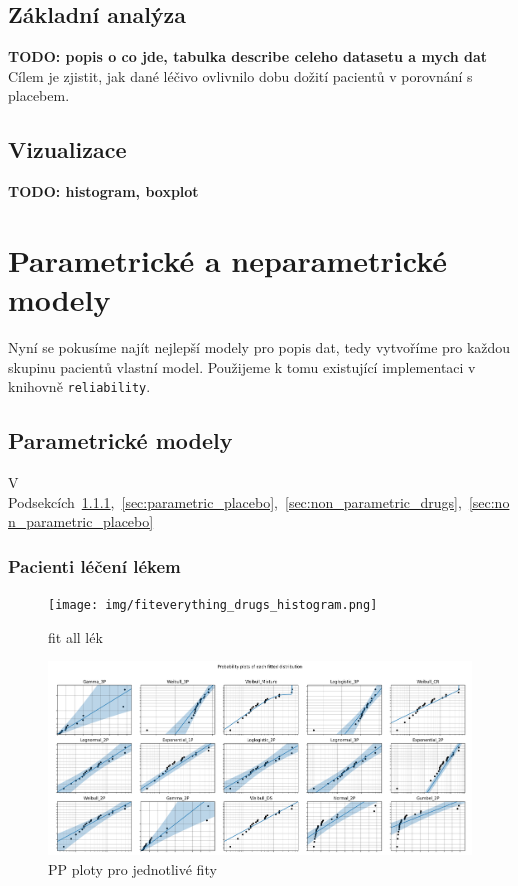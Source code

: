 \documentclass[a4, 11pt]{article}
\newcommand{\commm}[1]{{\textcolor[cmyk]{0,1,0,0}{\textbf{\textsf{#1}}}}}      %
\theoremstyle{definition}
\theoremstyle{remark}
\begin{document}
	\subsection{Základní analýza}
	\commm{TODO: popis o co jde, tabulka describe celeho datasetu a mych dat} 
	Cílem je zjistit, jak dané léčivo ovlivnilo dobu dožití pacientů v porovnání s placebem. 

	



	
	\subsection{Vizualizace}
	\commm{TODO: histogram, boxplot}
	





	\section{Parametrické a neparametrické modely}
	Nyní se pokusíme najít nejlepší modely pro popis dat, tedy vytvoříme pro každou skupinu pacientů vlastní model. Použijeme k tomu existující implementaci v knihovně \texttt{reliability}.
	
	\subsection{Parametrické modely}
	V Podsekcích~\ref{sec:parametric_drugs},~\ref{sec:parametric_placebo},~\ref{sec:non_parametric_drugs},~\ref{sec:non_parametric_placebo}
	
	
	\subsubsection{Pacienti léčení lékem} \label{sec:parametric_drugs}
	
	\begin{figure}[H]
		\centering
		\texttt{[image: img/fiteverything\_drugs\_histogram.png]}
		\caption{fit all lék}
		\label{fig:fit_everything_hist_drugs}
	\end{figure}

	\begin{figure}[H]
		\centering
		\includegraphics[width=0.9\linewidth]{img/fiteverything_drug_PP_plots.png}
		\caption{PP ploty pro jednotlivé fity}
		\label{fig:fit_everything_drug_PP_plots}
	\end{figure}
\end{document}
